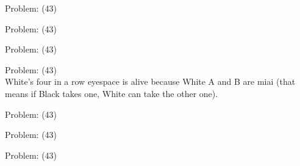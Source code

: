 \documentclass[11pt]{article}
\begin{document}
\begin{minipage}[t]{0.5\textwidth}
  {\centering
  
  Problem: (43)\\
  
  }
\end{minipage}
\begin{minipage}[t]{0.5\textwidth}
  {\centering
  
  Problem: (43)\\
  
  }
\end{minipage}
\begin{minipage}[t]{0.5\textwidth}
  {\centering
  
  Problem: (43)\\
  
  }
\end{minipage}
\begin{minipage}[t]{0.5\textwidth}
  {\centering
  
  Problem: (43)\\
  White's four in a row eyespace is alive because White A and B are miai (that means if Black takes one, White can take the other one).\\
  }
\end{minipage}
\begin{minipage}[t]{0.5\textwidth}
  {\centering
  
  Problem: (43)\\
  
  }
\end{minipage}
\begin{minipage}[t]{0.5\textwidth}
  {\centering
  
  Problem: (43)\\
  
  }
\end{minipage}
\begin{minipage}[t]{0.5\textwidth}
  {\centering
  
  Problem: (43)\\
  
  }
\end{minipage}
\end{document}

